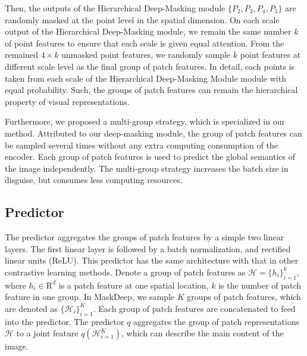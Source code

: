 \documentclass[10pt,twocolumn,letterpaper]{article}
\begin{document}
Then, the outputs of the Hierarchical Deep-Masking module $\{P_2, P_3, P_4, P_5\}$ are randomly masked at the point level in the spatial dimension. On each scale output of the Hierarchical Deep-Masking module, we remain the same number $k$ of point features to ensure that each scale is given equal attention. From the remained $4\times k$ unmasked point features, we randomly sample $k$ point features at different scale level as the final group of patch features. In detail, each points is taken from each scale of the Hierarchical Deep-Masking Module module with equal probability. Such, the groups of patch features can remain the hierarchical property of visual representations.

Furthermore, we proposed a multi-group strategy, which is specialized in our method. Attributed to our deep-masking module, the group of patch features can be sampled several times without any extra computing consumption of the encoder. Each group of patch features is used to predict the global semantics of the image independently. The multi-group strategy increases the batch size in disguise, but consumes less computing resources.

\subsection{Predictor}
The predictor aggregates the groups of patch features by a simple two linear layers. The first linear layer is followed by a batch normalization\cite{ioffe2015batch}, and rectified linear units (ReLU)\cite{nair2010rectified}. This predictor has the same architecture with that in other contrastive learning methods. Denote a group of patch features as $\mathcal{H} = \{h_i\}_{i=1}^{k}$, where $h_i\in \mathrm{R}^d$ is a patch feature at one spatial location, $k$ is the number of patch feature in one group. In MaskDeep, we sample $K$ groups of patch features, which are denoted as $\{ \mathcal{H}_i \}_{i=1}^{K}$. Each group of patch features are concatenated to feed into the predictor. The predictor $q$ aggregates the group of patch representations $\mathcal{H}$ to a joint feature $q(\mathcal{H}_{i=1}^{K})$, which can describe the main content of the image. 
\end{document}
